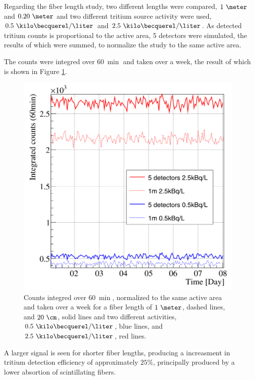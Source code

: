 Regarding the fiber length study, two different lengths were compared, $1~\meter$ and $0.20~\meter$ and two different tritium source activity were used, $0.5~\kilo\becquerel/\liter$ and $2.5~\kilo\becquerel/\liter$. As detected tritium counts is proportional to the active area, 5 detectors were simulated, the results of which were summed, to normalize the study to the same active area.

The counts were integred  over $60~\min$ and taken over a week, the result of which is shown in Figure \ref{fig:CountsOver60minDifferentLength}.

\begin{figure}[h]
\centering
\includegraphics[scale=0.3]{Figures/8SimulationsResults/81TRITIUMDesign/813Length/2DifferentLength.png}
\caption{Counts integred over $60~\min$, normalized to the same active area and taken over a week for a fiber length of $1~\meter$, dashed lines, and $20~\cm$, solid lines and two different activities, $0.5~\kilo\becquerel/\liter$, blue lines, and $2.5~\kilo\becquerel/\liter$, red lines. \label{fig:CountsOver60minDifferentLength}}
\end{figure}

A larger signal is seen for shorter fiber lengths, producing a increasment in tritium detection efficiency of approximately $25\%$, principally produced by a lower absortion of scintillating fibers.

